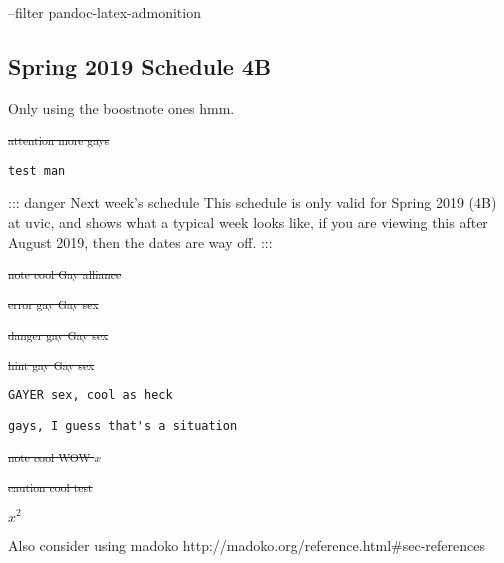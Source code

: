 \documentclass[]{article}
\date{}
\newenvironment{env-ab80a99c-a969-4d90-a71e-53ac50534c3a}
{
    \savenotes
    \begin{mdframed}[topline=false,bottomline=false,rightline=false,linewidth=2pt,innerleftmargin=5pt,leftmargin=-4pt,innerrightmargin=0pt,linecolor=black,skipabove=\topskip]
    \let\thempfootnote=\thefootnote
    \let\oldfootnote\footnote
    \renewcommand{\footnote}[1]{\stepcounter{footnote}\oldfootnote{##1}}
}
{
    \let\footnote\oldfootnote
    \end{mdframed}
    \spewnotes
}
\begin{document}
--filter pandoc-latex-admonition

\subsection{Spring 2019 Schedule 4B}\label{spring-2019-schedule-4b}

Only using the boostnote ones hmm.

\textsubscript{\sout{attention more gays}}

\begin{verbatim}
test man
\end{verbatim}

::: danger Next week's schedule This schedule is only valid for Spring
2019 (4B) at uvic, and shows what a typical week looks like, if you are
viewing this after August 2019, then the dates are way off. :::

\textsubscript{\sout{note cool Gay alliance}}

\textsubscript{\sout{error gay Gay sex}}

\textsubscript{\sout{danger gay Gay sex}}

\textsubscript{\sout{hint gay Gay sex}}

\begin{env-ab80a99c-a969-4d90-a71e-53ac50534c3a}

\begin{verbatim}
GAYER sex, cool as heck
\end{verbatim}

\end{env-ab80a99c-a969-4d90-a71e-53ac50534c3a}

\begin{verbatim}
gays, I guess that's a situation
\end{verbatim}

\textsubscript{\sout{note cool WOW \(x\)}}

\textsubscript{\sout{caution cool test}}

\(x^2\)

Also consider using madoko
http://madoko.org/reference.html\#sec-references
\end{document}
